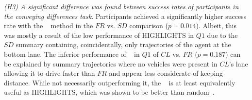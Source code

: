 







\emph{(H3) A significant difference was found between success rates of participants in the conveying differences task}. Participants achieved a significantly higher success rate with the \disalg~ method in the $FR$ vs. $SD$ comparison ($p = 0.014$). Albeit, this was mostly a result of the low performance of HIGHLIGHTS in $Q1$ due to the $SD$ summary containing, coincidentally, only trajectories of the agent at the bottom lane. 
The inferior performance of \disalg~ in $Q1$ of $CL$ vs. $FR$  ($p = 0.187$) can be explained by summary trajectories where no vehicles were present in $CL$'s lane allowing it to drive faster than $FR$ and appear less considerate of keeping distance.
While not necessarily outperforming it, the \disalg~ is at least equivalently useful as HIGHLIGHTS, which was shown to be better than random~\cite{Tobias}.


